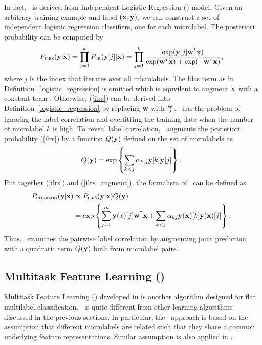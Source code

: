 {In fact, \corrlog\ is derived from Independent Logistic Regression (\ilrs) model. 
Given an arbitrary training example and label $(\mathbf {x},\mathbf {y})$, we can construct a set of independent logistic regreesion classifiers, one for each microlabel.
The posteriori probability can be computed by
\begin{align}
	P_{\text{{\sc ilrs}}}(\mathbf {y}|\mathbf {x}) 
	= \prod_{j=1}^{k}P_{\text{{\sc lr}}}(\mathbf {y}[j]|\mathbf {x})
	= \prod_{j=1}^{k}\frac{\exp(\mathbf {y}[j]\mathbf {w}^{^{\intercal}}\mathbf {x})}{\exp(\mathbf {w}^{^{\intercal}}\mathbf {x})+\exp(-\mathbf {w}^{^{\intercal}}\mathbf {x})}, \label{ilrs}
\end{align}
where $j$ is the index that iterates over all microlabels. 
The bias term as in Definition~\ref{logistic_regression} is omitted which is equvilent to augment $\mathbf {x}$ with a constant term \citep{Bian12corrlog}.
Otherwise, (\ref{ilrs}) can be derived into Definition~\ref{logistic_regression} by replacing $\mathbf {w}$ with $\frac{\mathbf {w}}{2}$.
\ilrs\ has the problem of ignoring the label correlation and overfitting the training data when the number of microlabel $k$ is high.
To reveal label correlation, \corrlog\ augments the posteriori probability (\ref{ilrs}) by a function $Q(\mathbf {y})$ defined on the set of microlabels as
\begin{align}
	Q(\mathbf {y}) = \exp\left\{\sum_{k<j}\alpha_{k,j}\mathbf {y}[k]\mathbf {y}[j]\right\}. \label{ilrs_augment}
\end{align}
Put together (\ref{ilrs}) and (\ref{ilrs_augment}), the formalism of \corrlog\ can be defined as
\begin{align*}
	P_{\text{{\sc corrlog}}}(\mathbf {y}|\mathbf {x}) &\propto P_{\text{{\sc ilrs}}}(\mathbf {y}|\mathbf {x}) Q(\mathbf {y}) \\
		&=\exp\left\{ \sum_{j=1}^{m}\mathbf {y}(x)[j]\mathbf {w}^{^{\intercal}}\mathbf {x} + \sum_{k<j}\alpha_{kj}\mathbf {y}(\mathbf {x})[k]\mathbf {y}(\mathbf {x})[j] \right\}.
\end{align*}
Thus, \corrlog\ examines the pairwise label correlation by augmenting joint prediction with a quadratic term $Q(\mathbf {y})$ built from microlabel pairs.



%
%
\subsection{Multitask Feature Learning (\mtl)} \label{sc_mtl}

Multitask Feature Learning (\mtl) developed in \citep{Argyriou07multitask} is another algorithm designed for flat multilabel classification.
\mtl\ is quite different from other learning algorithms discussed in the previous sections.
In particular, the \mtl\ approach is based on the assumption that different microlabels are related such that they share a common underlying feature representations.
Similar assumption is also applied in \citep{Caruana97multitask,Baxter00a,BenDavide03exploiting}.

}
